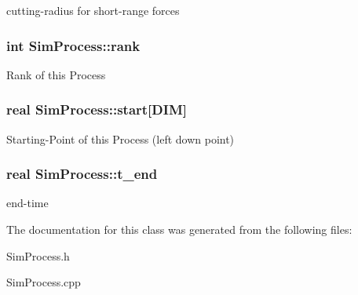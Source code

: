 cutting-\/radius for short-\/range forces \hypertarget{class_sim_process_a61c8c83a418419c93c7b78ddc7619fe3}{
\subsubsection[{rank}]{\setlength{\rightskip}{0pt plus 5cm}int Sim\-Process\-::rank}}\label{class_sim_process_a61c8c83a418419c93c7b78ddc7619fe3}
Rank of this Process \hypertarget{class_sim_process_a0ccee10b1ffc00cc7846c4530f8e0357}{
\subsubsection[{start}]{\setlength{\rightskip}{0pt plus 5cm}real Sim\-Process\-::start\mbox{[}D\-I\-M\mbox{]}}}\label{class_sim_process_a0ccee10b1ffc00cc7846c4530f8e0357}
Starting-\/\-Point of this Process (left down point) \hypertarget{class_sim_process_aa9b2269bf9f85fa0f8bc7aa7932ef046}{
\subsubsection[{t\-\_\-end}]{\setlength{\rightskip}{0pt plus 5cm}real Sim\-Process\-::t\-\_\-end}}\label{class_sim_process_aa9b2269bf9f85fa0f8bc7aa7932ef046}
end-\/time 

The documentation for this class was generated from the following files\-:\begin{DoxyCompactItemize}
\item 
Sim\-Process.\-h\item 
Sim\-Process.\-cpp\end{DoxyCompactItemize}
